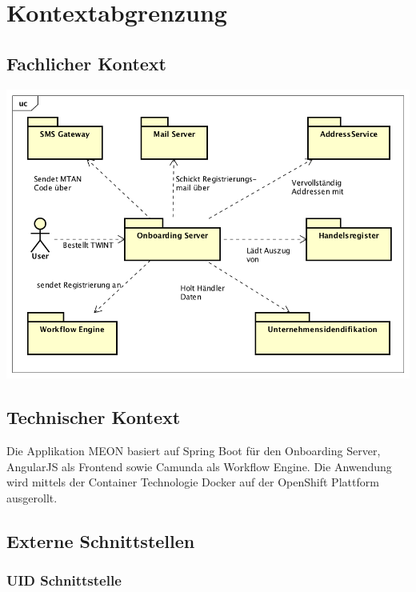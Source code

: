\graphicspath{{./images/}}

\chapter{Kontextabgrenzung}

\section{Fachlicher Kontext}

\begin{center}
	\includegraphics[scale=0.6]{Contextdiagramm.png}
\end{center}

\section{Technischer Kontext}

Die Applikation MEON basiert auf Spring Boot für den Onboarding Server, AngularJS als Frontend sowie Camunda als Workflow Engine. Die Anwendung wird mittels der Container Technologie Docker auf der OpenShift Plattform ausgerollt. 

\section{Externe Schnittstellen}

\subsection{UID Schnittstelle}

